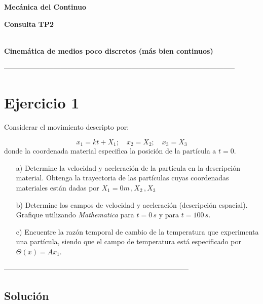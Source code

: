 \documentclass[10pt,a4paper]{article}
\begin{document}
\begin{center}
\bf{Mecánica del Continuo} \vspace*{0.2cm} \linebreak
\vspace{0.050cm}
\begin{Large}\bf{Consulta TP2} \end{Large} \vspace*{0.2cm}\\ \bf{Cinemática de medios poco discretos (más bien continuos)}
 \end{center}
\begin{center}
--------------------------------------------------------------------------------------------------
\end{center} 

\section*{Ejercicio 1}
Considerar el movimiento descripto por:


\begin{equation}\label{e1}
x_1 = kt+X_1 ; \quad x_2 = X_2 ;\quad x_3 = X_3
\end{equation}
\noindent donde la coordenada material especifica la posici\'on de la part\'icula a $t=0$.

\begin{itemize}
\item[a)] Determine la velocidad y aceleraci\'on de la part\'icula en la descripción material. Obtenga la trayectoria de las partículas cuyas coordenadas materiales están dadas por $X_1 = 0 m\, , X_2 \, , X_3 $
\item[b)] Determine los campos de velocidad y aceleración (descripción espacial). Grafique utilizando \textit{Mathematica} para $t = 0 \, s$ y para $t = 100 \, s$. 
\item[c)] Encuentre la razón temporal de cambio de la temperatura que experimenta una partícula, siendo que el campo de temperatura está especificado por $\Theta(x)=A x_1$. 
\end{itemize}

\begin{center}------------------------------------------------------------------------------\end{center}

\subsection*{Solución}
\end{document}
